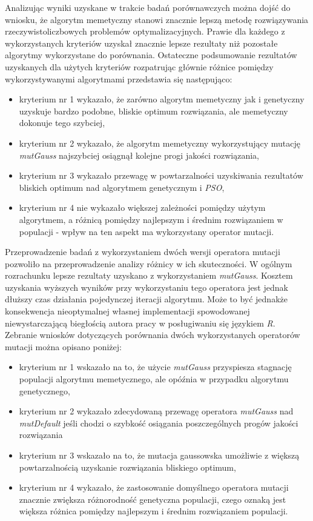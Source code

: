 \par
Analizując wyniki uzyskane w trakcie badań porównawczych można dojść do wniosku, że algorytm memetyczny stanowi znacznie lepszą metodę rozwiązywania rzeczywistoliczbowych problemów optymalizacyjnych. Prawie dla każdego z wykorzystanych kryteriów uzyskał znacznie lepsze rezultaty niż pozostałe algorytmy wykorzystane do porównania. Ostateczne podsumowanie rezultatów uzyskanych dla użytych kryteriów rozpatrując głównie różnice pomiędzy wykorzystywanymi algorytmami przedstawia się następująco:
\begin{itemize}
\item kryterium nr 1 wykazało, że zarówno algorytm memetyczny jak i genetyczny uzyskuje bardzo podobne, bliskie optimum rozwiązania, ale memetyczny dokonuje tego szybciej, 
\item kryterium nr 2 wykazało, że algorytm memetyczny wykorzystujący mutację \emph{mutGauss} najszybciej osiągnął kolejne progi jakości rozwiązania, 
\item kryterium nr 3 wykazało przewagę w powtarzalności uzyskiwania rezultatów bliskich optimum nad algorytmem genetycznym i \emph{PSO},
\item kryterium nr 4 nie wykazało większej zależności pomiędzy użytym algorytmem, a różnicą pomiędzy najlepszym i średnim rozwiązaniem w populacji - wpływ na ten aspekt ma wykorzystany operator mutacji.
\end{itemize}

\par 
Przeprowadzenie badań z wykorzystaniem dwóch wersji operatora mutacji pozwoliło na przeprowadzenie analizy różnicy w ich skuteczności. W ogólnym rozrachunku lepsze rezultaty uzyskano z wykorzystaniem \emph{mutGauss}. Kosztem uzyskania wyższych wyników przy wykorzystaniu tego operatora jest jednak dłuższy czas działania pojedynczej iteracji algorytmu. Może to być jednakże konsekwencja nieoptymalnej własnej implementacji spowodowanej niewystarczającą biegłością autora pracy w posługiwaniu się językiem \emph{R}. Zebranie wniosków dotyczących porównania dwóch wykorzystanych operatorów mutacji można opisano poniżej:
\begin{itemize}
\item kryterium nr 1 wskazało na to, że użycie \emph{mutGauss} przyspiesza stagnację populacji algorytmu memetycznego, ale opóźnia w przypadku algorytmu genetycznego,
\item kryterium nr 2 wykazało zdecydowaną przewagę operatora \emph{mutGauss} nad \emph{mutDefault} jeśli chodzi o szybkość osiągania poszczególnych progów jakości rozwiązania
\item kryterium nr 3 wskazało na to, że mutacja gaussowska umożliwie z większą powtarzalnością uzyskanie rozwiązania bliskiego optimum,
\item kryterium nr 4 wykazało, że zastosowanie domyślnego operatora mutacji znacznie zwiększa różnorodność genetyczna populacji, czego oznaką jest większa różnica pomiędzy najlepszym i średnim rozwiązaniem populacji.
\end{itemize}

